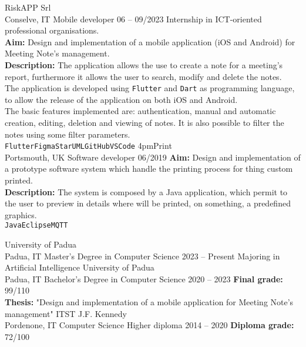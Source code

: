 \documentclass[9pt]{developercv} %
\begin{document}
\begin{entrylist}
	\entry
		{RiskAPP Srl\\\footnotesize{Conselve, IT}}
		{Mobile developer}
		{06 -- 09/2023}
		{Internship in ICT-oriented professional organisations. \\
		\textbf{Aim:} Design and implementation of a mobile application (iOS and Android) for Meeting Note's management. \\
		\textbf{Description:} The application allows the use to create a note for a meeting's report, furthermore it allows the user to search, modify and delete the notes. \\
		The application is developed using \texttt{Flutter} and \texttt{Dart} as programming language, to allow the release of the application on both iOS and Android. \\
		The basic features implemented are: authentication, manual and automatic creation, editing, deletion and viewing of notes. It is also possible to filter the notes using some filter parameters. \\
		\texttt{Flutter}\slashsep\texttt{Figma}\slashsep\texttt{StarUML}\slashsep\texttt{GitHub}\slashsep\texttt{VSCode}}
	\entry
		{4pmPrint\\\footnotesize{Portsmouth, UK}}
		{Software developer}
		{06/2019}
		{\textbf{Aim:} Design and implementation of a prototype software system which handle the printing process for thing custom printed. \\
		\textbf{Description:} The system is composed by a Java application, which permit to the user to preview in details where will be printed, on something, a predefined graphics. \\
		\texttt{Java}\slashsep\texttt{Eclipse}\slashsep\texttt{MQTT}}
\end{entrylist}



\begin{entrylist}
	\entry
		{University of Padua\\\footnotesize{Padua, IT}}
		{Master's Degree in Computer Science}
		{2023 -- Present}
		{Majoring in Artificial Intelligence}
	\entry
		{University of Padua\\\footnotesize{Padua, IT}}
		{Bachelor's Degree in Computer Science}
		{2020 -- 2023}
		{\textbf{Final grade:} 99/110 \\
		\textbf{Thesis:} "Design and implementation of a mobile application for Meeting Note's management"}
	\entry
		{ITST J.F. Kennedy\\\footnotesize{Pordenone, IT}}
		{Computer Science Higher diploma}
		{2014 -- 2020}
		{\textbf{Diploma grade:} 72/100}
\end{entrylist}
\end{document}
